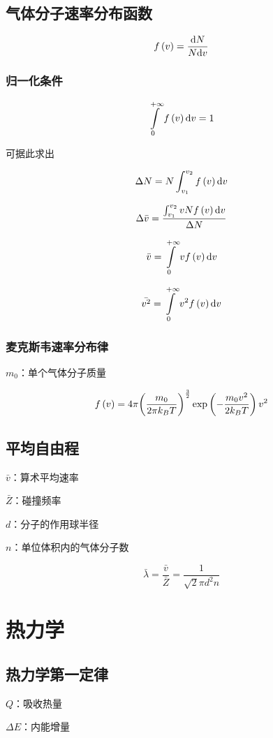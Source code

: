 \documentclass{article}
\begin{document}
\subsection{气体分子速率分布函数}

\[f\left(v\right)=\frac{\mathrm d N}{N\mathrm d v}\]

\subsubsection{归一化条件}

\[\int\limits_0^{+\infty}f\left(v\right)\mathrm d v=1\]

可据此求出

\[\Delta N=N\int_{v_1}^{v_2}f\left(v\right)\mathrm d v\]

\[\Delta\bar v=\dfrac{\int_{v_1}^{v_2}vNf\left(v\right)\mathrm d v}{\Delta N}\]

\[\bar v=\int\limits_0^{+\infty}vf\left(v\right)\mathrm d v\]

\[\bar{v^2}=\int\limits_0^{+\infty}v^2f\left(v\right)\mathrm d v\]

\subsubsection{麦克斯韦速率分布律}

$m_0$：单个气体分子质量

\[f\left(v\right)=4\pi{\left(\frac{m_0}{2\pi k_BT}\right)}^{\frac32}\exp\left(-\frac{m_0v^2}{2k_BT}\right)v^2\]

\subsection{平均自由程}

$\bar v$：算术平均速率

$\bar Z$：碰撞频率

$d$：分子的作用球半径

$n$：单位体积内的气体分子数

\[\bar\lambda=\frac{\bar v}{\bar Z}=\frac1{\sqrt2\pi d^2n}\]

\section{热力学}

\subsection{热力学第一定律}

$Q$：吸收热量

$\Delta E$：内能增量
\end{document}
